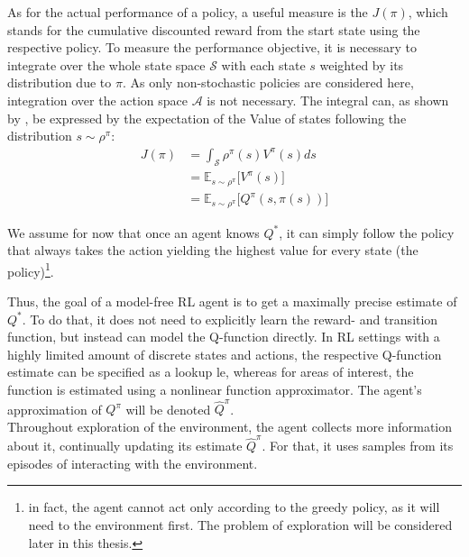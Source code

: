 As for the actual performance of a policy, a useful measure is the  $J(\pi)$, which stands for the cumulative discounted reward from the start state using the respective policy. To measure the performance objective, it is necessary to integrate over the whole state space $\mathcal{S}$ with each state $s$ weighted by its distribution due to $\pi$. As only non-stochastic policies are considered here, integration over the action space $\mathcal{A}$ is not necessary. The integral can, as shown by \cite{silver_deterministic_2014}, be expressed by the expectation of the Value of states following the distribution $s\sim\rho^\pi$:
\begin{align}
	J(\pi) &= \int_\mathcal{S} \rho^\pi(s) V^\pi(s) ds \nonumber\\
	       &= \mathds{E}_{s\sim\rho^\pi} \big[V^\pi(s)] \nonumber\\
	       &= \mathds{E}_{s\sim\rho^\pi} \big[Q^\pi(s, \pi(s))] \label{eq:performance01}
\end{align}


\noindent We assume for now that once an agent knows $Q^*$, it can simply follow the policy that always takes the action yielding the highest value for every state (the  policy)\footnote{in fact, the agent cannot act only according to the greedy policy, as it will need to  the environment first. The problem of exploration will be considered later in this thesis.}. 

Thus, the goal of a model-free RL agent is to get a maximally precise estimate of $Q^*$. To do that, it does not need to explicitly learn the reward- and transition function, but instead can model the Q-function directly. In RL settings with a highly limited amount of discrete states and actions, the respective Q-function estimate can be specified as a lookup le, whereas for areas of interest, the function is estimated using a nonlinear function approximator. The agent's approximation of $Q^\pi$ will be denoted $\hat{Q}^\pi$. \\

\noindent Throughout exploration of the environment, the agent collects more information about it, continually updating its estimate $\hat{Q}^\pi$. For that, it uses samples from its episodes of interacting with the environment. %


